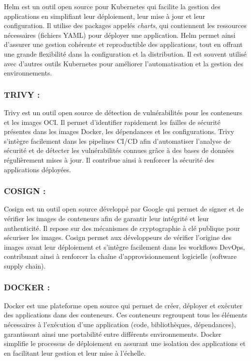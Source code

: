 Helm est un outil open source pour Kubernetes qui facilite la gestion des applications en simplifiant leur déploiement, leur mise à jour et leur configuration. Il utilise des packages appelés \textit{charts}, qui contiennent les ressources nécessaires (fichiers YAML) pour déployer une application. Helm permet ainsi d’assurer une gestion cohérente et reproductible des applications, tout en offrant une grande flexibilité dans la configuration et la distribution. Il est souvent utilisé avec d’autres outils Kubernetes pour améliorer l’automatisation et la gestion des environnements.

\subsubsection{TRIVY :}

Trivy est un outil open source de détection de vulnérabilités pour les conteneurs et les images OCI. Il permet d’identifier rapidement les failles de sécurité présentes dans les images Docker, les dépendances et les configurations. Trivy s’intègre facilement dans les pipelines CI/CD afin d’automatiser l’analyse de sécurité et de détecter les vulnérabilités connues grâce à des bases de données régulièrement mises à jour. Il contribue ainsi à renforcer la sécurité des applications déployées.

\subsubsection{COSIGN :}

Cosign est un outil open source développé par Google qui permet de signer et de vérifier les images de conteneurs afin de garantir leur intégrité et leur authenticité. Il repose sur des mécanismes de cryptographie à clé publique pour sécuriser les images. Cosign permet aux développeurs de vérifier l’origine des images avant leur déploiement et s’intègre facilement dans les workflows DevOps, contribuant ainsi à renforcer la chaîne d’approvisionnement logicielle (software supply chain).
\subsubsection{DOCKER :}

Docker est une plateforme open source qui permet de créer, déployer et exécuter des applications dans des conteneurs. Ces conteneurs regroupent tous les éléments nécessaires à l’exécution d’une application (code, bibliothèques, dépendances), garantissant ainsi une portabilité entre différents environnements. Docker simplifie le processus de déploiement en assurant une isolation des applications et en facilitant leur gestion et leur mise à l’échelle.

